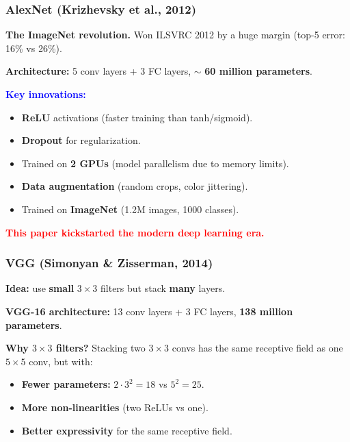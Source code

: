 \documentclass[notes,11pt, aspectratio=169]{beamer}
\begin{document}
\begin{frame}
\frametitle{AlexNet (Krizhevsky et al., 2012)}

\textbf{The ImageNet revolution.} Won ILSVRC 2012 by a huge margin (top-5 error: 16\% vs 26\%).

\vspace{6pt}
\textbf{Architecture:} 5 conv layers + 3 FC layers, $\sim$ \textbf{60 million parameters}.

\vspace{6pt}
\textcolor{blue}{\textbf{Key innovations:}}
\begin{itemize}
    \item \textbf{ReLU} activations (faster training than tanh/sigmoid).
    \item \textbf{Dropout} for regularization.
    \item Trained on \textbf{2 GPUs} (model parallelism due to memory limits).
    \item \textbf{Data augmentation} (random crops, color jittering).
    \item Trained on \textbf{ImageNet} (1.2M images, 1000 classes).
\end{itemize}

\vspace{8pt}
\begin{center}
\textcolor{red}{\textbf{This paper kickstarted the modern deep learning era.}}
\end{center}
\end{frame}

\begin{frame}
\frametitle{VGG (Simonyan \& Zisserman, 2014)}

\textbf{Idea:} use \textbf{small} $3 \times 3$ filters but stack \textbf{many} layers.

\vspace{6pt}
\textbf{VGG-16 architecture:} 13 conv layers + 3 FC layers, \textbf{138 million parameters}.

\vspace{8pt}
\textbf{Why $3 \times 3$ filters?} Stacking two $3 \times 3$ convs has the same receptive field as one $5 \times 5$ conv, but with:
\begin{itemize}
    \item \textbf{Fewer parameters:} $2 \cdot 3^2 = 18$ vs $5^2 = 25$.
    \item \textbf{More non-linearities} (two ReLUs vs one).
    \item \textbf{Better expressivity} for the same receptive field.
\end{itemize}

\vspace{8pt}
\end{frame}
\end{document}
